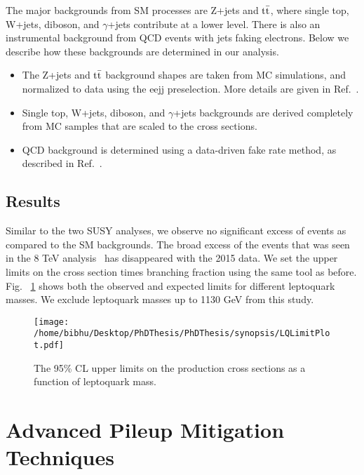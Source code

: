 The major backgrounds from SM processes are Z+jets and $\rm t\bar{t}$, where single top,
 W+jets, diboson, and $\gamma$+jets contribute at a lower level. There is also an instrumental background from QCD events with jets faking electrons. Below we describe how these
backgrounds are determined in our analysis.
\begin{itemize}
\item The Z+jets and $\rm t\bar{t}$ background shapes are taken from MC simulations, and normalized
 to data using the eejj preselection. More details are given in Ref.~\cite{CMS-PAS-EXO-16-043}.
\item Single top, W+jets, diboson, and $\gamma$+jets backgrounds are derived completely from
 MC samples that are scaled to the cross sections.
 \item QCD background is determined using a data-driven fake rate method, as
 described in Ref.~\cite{CMS-PAS-EXO-16-043}.

\end{itemize}




\subsection{Results}
Similar to the two SUSY analyses, we observe no significant excess of events as compared to the SM backgrounds. The broad excess of the events that was seen in the 8 TeV analysis~\cite{CMS-PAS-EXO-12-041} has disappeared with the 2015 data. We set the upper limits on the cross section times branching fraction using the same tool as before. Fig. ~\ref{figure:LimitLQ12016Synop} shows both the observed and expected limits for different leptoquark masses. We exclude leptoquark masses up to 1130 GeV from this study. 

\begin{figure}[h]
\centering
\texttt{[image: /home/bibhu/Desktop/PhDThesis/PhDThesis/synopsis/LQLimitPlot.pdf]}

\caption{\label{figure:LimitLQ12016Synop}The 95\% CL upper limits on the production cross sections as a function of leptoquark mass.}
\end{figure}



\section{Advanced Pileup Mitigation Techniques}

